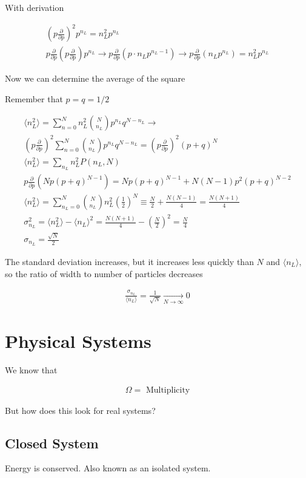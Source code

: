 \documentclass[fleqn]{report}
\newcommand{\del}{\partial}
\newcommand{\equations} [1] {
\begin{gather*}
#1
\end{gather*}
}
\begin{document}
With derivation 
\equations{
    \left( p \frac{\del}{\del p}\right)^2 
    p^{n_L}
    =
    n_L^2 p^{n_L}
    \\
    p \frac{\del}{\del p}
    \left( p \frac{\del}{\del p}\right) p^{n_L}
    \rightarrow 
    p \frac{\del}{\del p}
    \left( p \cdot n_L p^{n_L - 1} \right)
    \rightarrow 
    p \frac{\del}{\del p}
    \left( n_L p^{n_L} \right)
    =
    n_L^2 p^{n_L}
}

Now we can determine the average of the square

Remember that $p = q = 1/2$
\equations{
    \langle n_L^2 \rangle
    =
    \sum^N_{n=0}
    n_L^2 {N \choose n_L}
    p^{n_L} q^{N - n_L}
    \rightarrow 
    \\
    \left( p \frac{\del}{\del p}\right)^2
    \sum^N_{n=0}
    {N \choose n_L}
    p^{n_L} q^{N - n_L}
    =
    \left( p \frac{\del}{\del p}\right)^2
    (p + q)^{N}
    \\
    \langle n_L^2 \rangle 
    =
    \sum_{n_L}
    n_L^2 P(n_L, N)
    \\
    p \frac{\del}{\del p}
    \left( 
        N p (p + q)^{N - 1} 
    \right)
    =
    N p (p + q)^{N - 1}
    +
    N(N -1)
    p^2 (p + q)^{N - 2}
    \\
    \langle n_L^2 \rangle 
    =
    \sum^N_{n_L = 0}
    {N \choose n_L} n_L^2 
    \left(\frac{1}{2}\right)^N
    \equiv 
    \frac{N}{2}
    +
    \frac{N(N-1)}{4}
    =
    \frac{N(N+1)}{4}
    \\
    \sigma_{n_L}^2 
    =
    \langle n_L^2 \rangle
    -
    \langle n_L \rangle^2
    =
    \frac{N(N+1)}{4}
    -
    \left(\frac{N}{2}\right)^2
    =
    \frac{N}{4}
    \\
    \sigma_{n_L}
    =
    \frac{\sqrt{N}}{2}
}

The standard deviation increases, but it increases less quickly
than $N$ and $\langle n_L \rangle$, so the ratio of width to number 
of particles decreases 

\equations{
    \frac{\sigma_{n_L}}{\langle n_L \rangle}
    =
    \frac{1}{\sqrt{N}}
    \underset{N \to \infty}{\longrightarrow}
    0
}

\section{Physical Systems}
We know that 
\equations{
    \Omega 
    =
    \textrm{ Multiplicity}
}
But how does this look for real systems?

\subsection{Closed System}
Energy is conserved. Also known as an isolated system.
\end{document}
